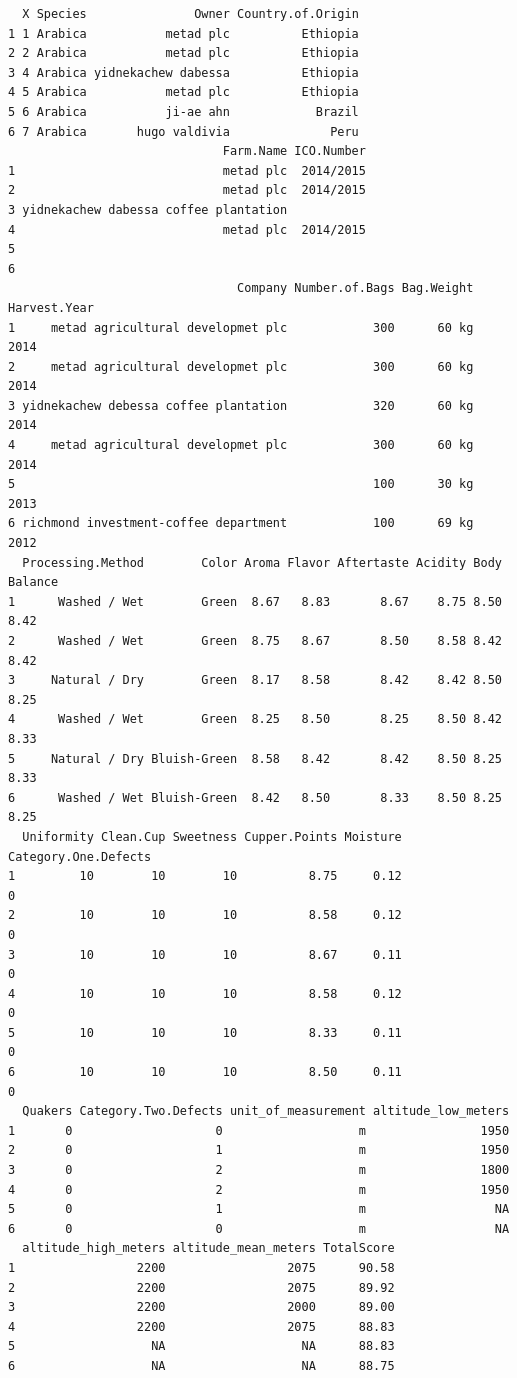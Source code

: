 \documentclass[
  letterpaper,
  DIV=11,
  numbers=noendperiod]{scrreprt}
\begin{document}
\begin{verbatim}
  X Species               Owner Country.of.Origin
1 1 Arabica           metad plc          Ethiopia
2 2 Arabica           metad plc          Ethiopia
3 4 Arabica yidnekachew dabessa          Ethiopia
4 5 Arabica           metad plc          Ethiopia
5 6 Arabica           ji-ae ahn            Brazil
6 7 Arabica       hugo valdivia              Peru
                              Farm.Name ICO.Number
1                             metad plc  2014/2015
2                             metad plc  2014/2015
3 yidnekachew dabessa coffee plantation           
4                             metad plc  2014/2015
5                                                 
6                                                 
                                Company Number.of.Bags Bag.Weight Harvest.Year
1     metad agricultural developmet plc            300      60 kg         2014
2     metad agricultural developmet plc            300      60 kg         2014
3 yidnekachew debessa coffee plantation            320      60 kg         2014
4     metad agricultural developmet plc            300      60 kg         2014
5                                                  100      30 kg         2013
6 richmond investment-coffee department            100      69 kg         2012
  Processing.Method        Color Aroma Flavor Aftertaste Acidity Body Balance
1      Washed / Wet        Green  8.67   8.83       8.67    8.75 8.50    8.42
2      Washed / Wet        Green  8.75   8.67       8.50    8.58 8.42    8.42
3     Natural / Dry        Green  8.17   8.58       8.42    8.42 8.50    8.25
4      Washed / Wet        Green  8.25   8.50       8.25    8.50 8.42    8.33
5     Natural / Dry Bluish-Green  8.58   8.42       8.42    8.50 8.25    8.33
6      Washed / Wet Bluish-Green  8.42   8.50       8.33    8.50 8.25    8.25
  Uniformity Clean.Cup Sweetness Cupper.Points Moisture Category.One.Defects
1         10        10        10          8.75     0.12                    0
2         10        10        10          8.58     0.12                    0
3         10        10        10          8.67     0.11                    0
4         10        10        10          8.58     0.12                    0
5         10        10        10          8.33     0.11                    0
6         10        10        10          8.50     0.11                    0
  Quakers Category.Two.Defects unit_of_measurement altitude_low_meters
1       0                    0                   m                1950
2       0                    1                   m                1950
3       0                    2                   m                1800
4       0                    2                   m                1950
5       0                    1                   m                  NA
6       0                    0                   m                  NA
  altitude_high_meters altitude_mean_meters TotalScore
1                 2200                 2075      90.58
2                 2200                 2075      89.92
3                 2200                 2000      89.00
4                 2200                 2075      88.83
5                   NA                   NA      88.83
6                   NA                   NA      88.75
\end{verbatim}
\end{document}

